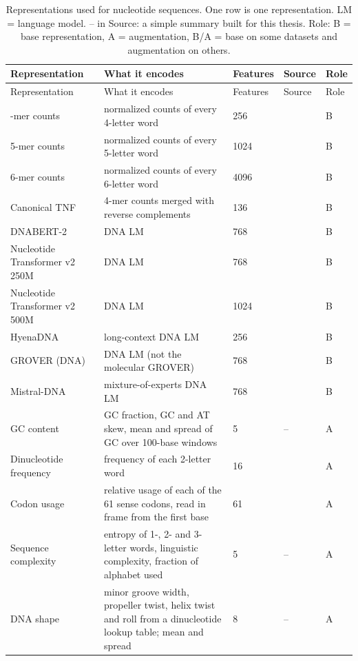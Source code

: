 \begin{longtable}{P{3.0cm}P{5.0cm}P{1.5cm}P{1.5cm}P{1.4cm}}
\caption[Representations used for nucleotide sequences.]{Representations used for nucleotide sequences. One row is one representation. LM = language model. -- in Source: a simple summary built for this thesis. Role: B = base representation, A = augmentation, B/A = base on some datasets and augmentation on others.}\label{tab:reps_nucleotides}\\
\toprule
Representation & What it encodes & Features & Source & Role \\
\midrule
\endfirsthead
\toprule
Representation & What it encodes & Features & Source & Role \\
\midrule
\endhead
\bottomrule
{}-mer counts & normalized counts of every 4-letter word & 256 & \citep{Vinga2003} & B \\
5-mer counts & normalized counts of every 5-letter word & 1024 & \citep{Vinga2003} & B \\
6-mer counts & normalized counts of every 6-letter word & 4096 & \citep{Vinga2003} & B \\
Canonical TNF & 4-mer counts merged with reverse complements & 136 & \citep{Teeling2004} & B \\
DNABERT-2 & DNA LM & 768 & \citep{Zhou2023DNABERT2} & B \\
Nucleotide Transformer v2 250M & DNA LM & 768 & \citep{DallaTorre2025} & B \\
Nucleotide Transformer v2 500M & DNA LM & 1024 & \citep{DallaTorre2025} & B \\
HyenaDNA & long-context DNA LM & 256 & \citep{Nguyen2023HyenaDNA} & B \\
GROVER (DNA) & DNA LM (not the molecular GROVER) & 768 & \citep{Sanabria2024} & B \\
Mistral-DNA & mixture-of-experts DNA LM & 768 & \citep{Mourad2024} & B \\
GC content & GC fraction, GC and AT skew, mean and spread of GC over 100-base windows & 5 & -- & A \\
Dinucleotide frequency & frequency of each 2-letter word & 16 & \citep{Vinga2003} & A \\
Codon usage & relative usage of each of the 61 sense codons, read in frame from the first base & 61 & \citep{Sharp1986} & A \\
Sequence complexity & entropy of 1-, 2- and 3-letter words, linguistic complexity, fraction of alphabet used & 5 & -- & A \\
DNA shape & minor groove width, propeller twist, helix twist and roll from a dinucleotide lookup table; mean and spread & 8 & -- & A \\
\end{longtable}


